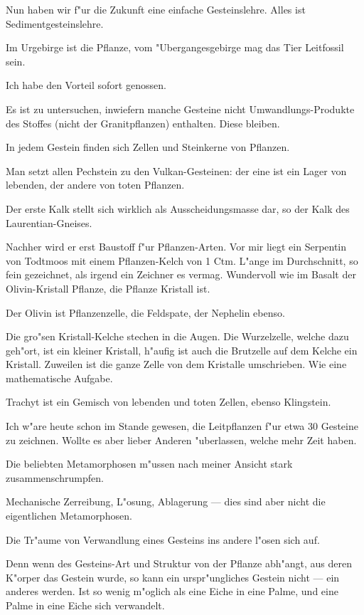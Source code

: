 \documentclass[a4paper, 11pt, oneside, german]{article}
\begin{document}
Nun haben wir f"ur die Zukunft eine einfache Gesteinslehre. Alles ist Sedimentgesteinslehre.

Im Urgebirge ist die Pflanze, vom "Ubergangesgebirge mag das Tier Leitfossil sein.

Ich habe den Vorteil sofort genossen.

Es ist zu untersuchen, inwiefern manche Gesteine nicht Umwandlungs-Produkte des Stoffes (nicht der Granitpflanzen) enthalten. Diese bleiben.

In jedem Gestein finden sich Zellen und Steinkerne von Pflanzen.

Man setzt allen Pechstein zu den Vulkan-Gesteinen: der eine ist ein Lager von lebenden, der andere von toten Pflanzen.

Der erste Kalk stellt sich wirklich als Ausscheidungsmasse dar, so der Kalk des Laurentian-Gneises.

Nachher wird er erst Baustoff f"ur Pflanzen-Arten. Vor mir liegt ein Serpentin von Todtmoos mit einem Pflanzen-Kelch von 1 Ctm. L"ange im Durchschnitt, so fein gezeichnet, als irgend ein Zeichner es vermag. Wundervoll wie im Basalt der Olivin-Kristall Pflanze, die Pflanze Kristall ist.

Der Olivin ist Pflanzenzelle, die Feldspate, der Nephelin ebenso.

Die gro"sen Kristall-Kelche stechen in die Augen. Die Wurzelzelle, welche dazu geh"ort, ist ein kleiner Kristall, h"aufig ist auch die Brutzelle auf dem Kelche ein Kristall. Zuweilen ist die ganze Zelle von dem Kristalle umschrieben. Wie eine mathematische Aufgabe.

Trachyt ist ein Gemisch von lebenden und toten Zellen, ebenso Klingstein.

Ich w"are heute schon im Stande gewesen, die Leitpflanzen f"ur etwa 30 Gesteine zu zeichnen. Wollte es aber lieber Anderen "uberlassen, welche mehr Zeit haben.

Die beliebten Metamorphosen m"ussen nach meiner Ansicht stark zusammenschrumpfen.

Mechanische Zerreibung, L"osung, Ablagerung --- dies sind aber nicht die eigentlichen Metamorphosen.

Die Tr"aume von Verwandlung eines Gesteins ins andere l"osen sich auf.

Denn wenn des Gesteins-Art und Struktur von der Pflanze abh"angt, aus deren K"orper das Gestein wurde, so kann ein urspr"ungliches Gestein nicht --- ein anderes werden. Ist so wenig m"oglich als eine Eiche in eine Palme, und eine Palme in eine Eiche sich verwandelt.
\clearpage
\end{document}

